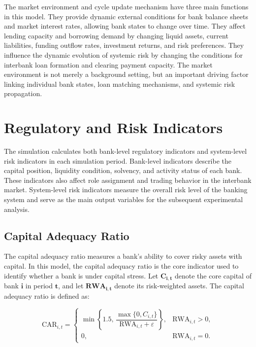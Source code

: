 The market environment and cycle update mechanism have three main
functions in this model. They provide dynamic external conditions for
bank balance sheets and market interest rates, allowing bank states to
change over time. They affect lending capacity and borrowing demand by
changing liquid assets, current liabilities, funding outflow rates,
investment returns, and risk preferences. They influence the dynamic
evolution of systemic risk by changing the conditions for interbank loan
formation and clearing payment capacity. The market environment is not
merely a background setting, but an important driving factor linking
individual bank states, loan matching mechanisms, and systemic risk
propagation.

\section{Regulatory and Risk Indicators}

The simulation calculates both bank-level regulatory indicators and
system-level risk indicators in each simulation period. Bank-level
indicators describe the capital position, liquidity condition, solvency,
and activity status of each bank. These indicators also affect role
assignment and trading behavior in the interbank market. System-level
risk indicators measure the overall risk level of the banking system and
serve as the main output variables for the subsequent experimental
analysis.

\subsection{Capital Adequacy Ratio}

The capital adequacy ratio measures a bank's ability to cover risky
assets with capital. In this model, the capital adequacy ratio is the
core indicator used to identify whether a bank is under capital stress.
Let \(\mathbf{C}_{\mathbf{i},\mathbf{t}}\) denote the core capital of
bank \(\mathbf{i}\) in period \(\mathbf{t}\), and let
\(\mathbf{RW}\mathbf{A}_{\mathbf{i},\mathbf{t}}\) denote its
risk-weighted assets. The capital adequacy ratio is defined as:


\begin{equation}
\mathrm{CAR}_{i,t}=\begin{cases}
 \min\left\{1.5,\,\dfrac{\max\{0,C_{i,t}\}}{\mathrm{RWA}_{i,t}+\varepsilon}\right\},
 &\mathrm{RWA}_{i,t}>0,\\[3pt]
 0,&\mathrm{RWA}_{i,t}=0.
 \end{cases}\label{eq:car}
\end{equation}


